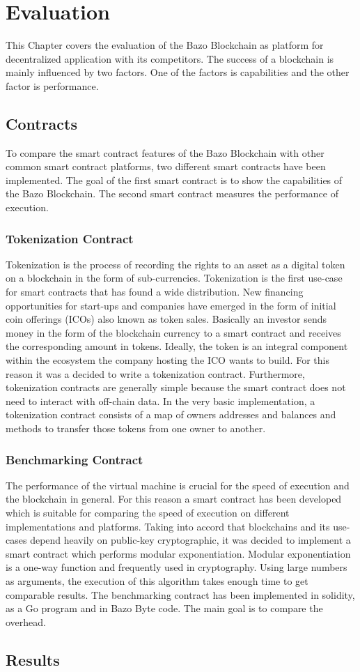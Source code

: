 \chapter{Evaluation}
This Chapter covers the evaluation of the Bazo Blockchain as platform for decentralized application with its competitors. The success of a blockchain is mainly influenced by two factors. One of the factors is capabilities and the other factor is performance. 

\section{Contracts}
To compare the smart contract features of the Bazo Blockchain  with other common smart contract platforms, two different smart contracts have been implemented. The goal of the first smart contract is to show the capabilities of the Bazo Blockchain. The second smart contract measures the performance of execution.

\subsection{Tokenization Contract}
Tokenization is the process of recording the rights to an asset as a digital token on a blockchain in the form of sub-currencies. \cite{eth_whitepaper} Tokenization is the first use-case for smart contracts that has found a wide distribution. New financing opportunities for start-ups and companies have emerged in the form of initial coin offerings (ICOs) also known as token sales. Basically an investor sends money in the form of the blockchain currency to a smart contract and receives the corresponding amount in tokens. Ideally, the token is an integral component within the ecosystem the company hosting the ICO wants to build. \cite{ico_pwc} For this reason it was a decided to write a tokenization contract. Furthermore, tokenization contracts are generally simple because the smart contract does not need to interact with off-chain data. In the very basic implementation, a tokenization contract consists of a map of owners addresses and balances and methods to transfer those tokens from one owner to another.

\subsection{Benchmarking Contract}
The performance of the virtual machine is crucial for the speed of execution and the blockchain in general. For this reason a smart contract has been developed which is suitable for comparing the speed of execution on different implementations and platforms. Taking into accord that blockchains and its use-cases depend heavily on public-key cryptographic, it was decided to implement a smart contract which performs modular exponentiation. Modular exponentiation is a one-way function and frequently used in cryptography. Using large numbers as arguments, the execution of this algorithm takes enough time to get comparable results. The benchmarking contract has been implemented in solidity, as a Go program and in Bazo Byte code. The main goal is to compare the overhead.

\section{Results}
